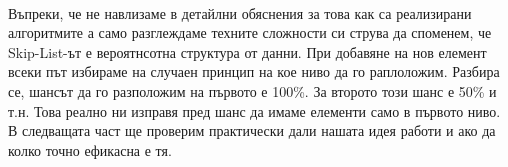 \documentclass[a4paper,12pt,fleqn]{article}
\begin{document}
	\\Въпреки, че не навлизаме в детайлни обяснения за това как са реализирани алгоритмите а само разглеждаме техните сложности си струва да споменем, че Skip-List-ът е вероятнсотна структура от данни. При добавяне на нов елемент всеки път избираме на случаен принцип на кое ниво да го раплоложим. Разбира се, шансът да го разположим на първото е 100\%. За второто този шанс е 50\% и т.н. Това реално ни изправя пред шанс да имаме елементи само в първото ниво. В следващата част ще проверим практически дали нашата идея работи и ако да колко точно ефикасна е тя.
	
\end{document}
